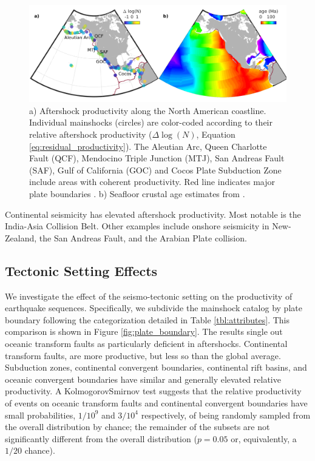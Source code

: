 \documentclass[draft, jgrga]{agujournal2018}
\begin{document}
    \begin{figure}
        \centering
        \includegraphics[width = \linewidth]{figures/regions.png}
        \caption{a) Aftershock productivity along the North American coastline.  Individual mainshocks (circles) are color-coded according to their relative aftershock productivity ($\Delta \log(N)$, Equation \ref{eq:residual_productivity}). The Aleutian Arc, Queen Charlotte Fault (QCF), Mendocino Triple Junction (MTJ), San Andreas Fault (SAF), Gulf of California (GOC) and Cocos Plate Subduction Zone include areas with coherent productivity. Red line indicates major plate boundaries \citep{Bird2003AnBoundaries}. b) Seafloor crustal age estimates from \citet{Muller2008}.}
        \label{fig:region}
    \end{figure}
    
    Continental seismicity has elevated aftershock productivity. Most notable is the India-Asia Collision Belt. Other examples include onshore seismicity in New-Zealand, the San Andreas Fault, and the Arabian Plate collision.
    
    \subsection{Tectonic Setting Effects}\label{sec:tectonic_setting}
    
    We investigate the effect of the seismo-tectonic setting on the productivity of earthquake sequences. Specifically, we subdivide the mainshock catalog by plate boundary following the categorization detailed in Table \ref{tbl:attributes}. This comparison is shown in Figure \ref{fig:plate_boundary}. The results single out oceanic transform faults as particularly deficient in aftershocks. Continental transform faults, are more productive, but less so than the global average. Subduction zones, continental convergent boundaries, continental rift basins, and oceanic convergent boundaries have similar and generally elevated relative productivity. A  Kolmogorov\-Smirnov test  suggests that the relative productivity of events on oceanic transform faults and continental convergent boundaries have small probabilities, $1/10^9$ and $3/10^4$ respectively, of being randomly sampled from the overall distribution by chance; the remainder of the subsets are not significantly different from the overall distribution ($p = 0.05$ or, equivalently, a  $1/20$ chance).
    
\end{document}
